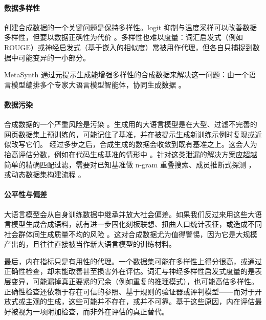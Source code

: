 \paragraph{数据多样性}
创建合成数据的一个关键问题是保持多样性。logit 抑制与温度采样可以改善数据多样性，但要以数据正确性为代价 \citep{chung-etal-2023-increasing}。多样性也难以度量：词汇启发式（例如 ROUGE）或神经启发式（基于嵌入的相似度）常被用作代理，但各自只捕捉到数据中可能变异的一小部分。

MetaSynth 通过元提示生成能增强多样性的合成数据来解决这一问题：由一个语言模型编排多个专家大语言模型智能体，协同生成数据 \citep{riaz-etal-2025-metasynth}。


\paragraph{数据污染}
合成数据的一个严重风险是污染 \citep{deng-etal-2024-unveiling, balloccu-etal-2024-leak}。生成用的大语言模型是在大型、过滤不完善的网页数据集上预训练的，可能记住了基准，并在被提示生成新训练示例时复现或近似改写它们。
经过多步之后，合成生成的数据会收敛到既有基准之上。这会人为抬高评估分数，例如在代码生成基准的情形中 \citep{matton-etal-2024-leakage}。针对这类泄漏的解决方案应超越简单的精确匹配过滤，需要对已知基准做 n-gram 重叠搜索、成员推断式探测 \citep{puerto-etal-2025-scaling, huang-etal-2026-robust}，或动态数据集构建流程 \citep{chen-etal-2025-benchmarking-large}。

\paragraph{公平性与偏差}
大语言模型会从自身训练数据中继承并放大社会偏差。如果我们反过来用这些大语言模型生成合成语料，就有进一步固化刻板联想、扭曲人口统计表征，或造成不同社会群体间生成质量不均的风险 \citep{gallegos2024bias}。这对合成数据尤为值得警惕，因为它是大规模产出的，且往往直接被当作新大语言模型的训练材料。

最后，内在指标只是有用性的代理。一个数据集可能在多样性上得分很高，或通过正确性检查，却未能改善甚至损害外在评估。词汇与神经多样性启发式度量的是表层变异，可能漏掉真正要紧的冗余（例如重复的推理模式），也可能高估多样性。%
正确性检查还依赖于存在可信的参照、基于规则的验证器或评判模型——而对于开放式或主观的生成，这些可能并不存在，或并不可靠。基于这些原因，内在评估最好被视为一项附加检查，而非外在评估的真正替代。




